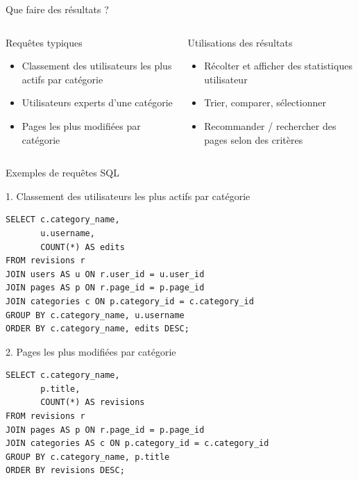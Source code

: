 \documentclass[a4paper,12pt]{beamer}
\begin{document}
\begin{frame}{Que faire des résultats ?}
    \begin{columns}[T]
        \begin{block}{Requêtes typiques}
            \begin{itemize}
                \item Classement des utilisateurs les plus actifs par catégorie
                \item Utilisateurs experts d'une catégorie
                \item Pages les plus modifiées par catégorie
            \end{itemize}
        \end{block}

        \begin{block}{Utilisations des résultats}
            \begin{itemize}
                \item Récolter et afficher des statistiques utilisateur
                \item Trier, comparer, sélectionner
                \item Recommander / rechercher des pages selon des critères
            \end{itemize}
        \end{block}
    \end{columns}
\end{frame}

\begin{frame}[fragile]{Exemples de requêtes SQL}

\scriptsize

\begin{block}{1. Classement des utilisateurs les plus actifs par catégorie}
\begin{lstlisting}
SELECT c.category_name,
       u.username,
       COUNT(*) AS edits
FROM revisions r
JOIN users AS u ON r.user_id = u.user_id
JOIN pages AS p ON r.page_id = p.page_id
JOIN categories c ON p.category_id = c.category_id
GROUP BY c.category_name, u.username
ORDER BY c.category_name, edits DESC;
\end{lstlisting}
\end{block}

\vspace{-0.2cm}

\begin{block}{2. Pages les plus modifiées par catégorie}
\begin{lstlisting}
SELECT c.category_name,
       p.title,
       COUNT(*) AS revisions
FROM revisions r
JOIN pages AS p ON r.page_id = p.page_id
JOIN categories AS c ON p.category_id = c.category_id
GROUP BY c.category_name, p.title
ORDER BY revisions DESC;
\end{lstlisting}
\end{block}

\end{frame}
\end{document}
